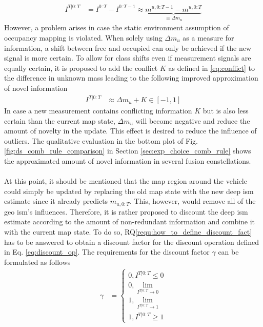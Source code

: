 \begin{align}
	\label{eq:non_redund_info_}
	I^{T|0:T} &= I^{0:T} - I^{0:T-1} \approx \underbrace{m^{u,0:T-1} - m^{u,0:T}}_{\equiv\Delta m_{u}}
\end{align}
However, a problem arises in case the static environment assumption of occupancy mapping is violated. When solely using $\Delta m_u$ as a measure for information, a shift between free and occupied can only be achieved if the new signal is more certain. To allow for class shifts even if measurement signals are equally certain, it is proposed to add the conflict $K$ as defined in \eqref{eq:conflict} to the difference in unknown mass leading to the following improved approximation of novel information 
\begin{align}
	\label{eq:non_redund_info}
	I^{T|0:T} &\approx \Delta m_{u} + K \in [-1,1]
\end{align}
In case a new measurement contains conflicting information $K$ but is also less certain than the current map state, $\Delta m_u$ will become negative and reduce the amount of novelty in the update. This effect is desired to reduce the influence of outliers. The qualitative evaluation in the bottom plot of Fig. \ref{fig:ds_comb_rule_comparison} in Section \ref{sec:exp_choice_comb_rule} shows the approximated amount of novel information in several fusion constellations.
\\\\
At this point, it should be mentioned that the map region around the vehicle could simply be updated by replacing the old map state with the new deep \gls{ism} estimate since it already predicts $m_{u,0:T}$. This, however, would remove all of the geo \gls{ism}'s influences. Therefore, it is rather proposed to discount the deep \gls{ism} estimate according to the amount of non-redundant information and combine it with the current map state. To do so, RQ\ref{requ:how_to_define_discount_fact} has to be answered to obtain a discount factor for the discount operation defined in Eq. \ref{eq:discount_op}. The requirements for the discount factor $\gamma$ can be formulated as follows
\begin{align}
	\label{eq:discount_factor_behavior}
	\gamma &= 
	\begin{cases}
		0, I^{T|0:T} \leq 0\\
		0, \lim\limits_{I^{T|0:T} \rightarrow 0}\\
		1, \lim\limits_{I^{T|0:T} \rightarrow 1}\\
		1, I^{T|0:T} \geq 1
	\end{cases}
\end{align}

